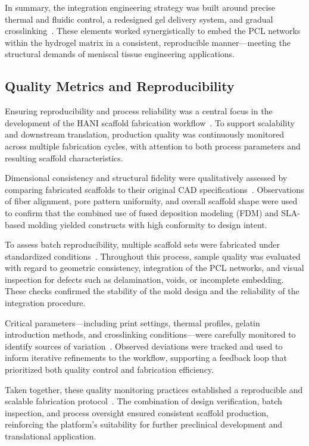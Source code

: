 In summary, the integration engineering strategy was built around precise thermal and fluidic control, a redesigned gel delivery system, and gradual crosslinking~\cite{elkommos2025hybridhydrogels}. These elements worked synergistically to embed the PCL networks within the hydrogel matrix in a consistent, reproducible manner—meeting the structural demands of meniscal tissue engineering applications.

\subsection{Quality Metrics and Reproducibility}

Ensuring reproducibility and process reliability was a central focus in the development of the HANI scaffold fabrication workflow~\cite{vedadghavami2017manufacturinghydrogel}. To support scalability and downstream translation, production quality was continuously monitored across multiple fabrication cycles, with attention to both process parameters and resulting scaffold characteristics.

Dimensional consistency and structural fidelity were qualitatively assessed by comparing fabricated scaffolds to their original CAD specifications~\cite{elkommos2025hybridhydrogels,elkommos2024developmentimproved}. Observations of fiber alignment, pore pattern uniformity, and overall scaffold shape were used to confirm that the combined use of fused deposition modeling (FDM) and SLA-based molding yielded constructs with high conformity to design intent.

To assess batch reproducibility, multiple scaffold sets were fabricated under standardized conditions~\cite{chaudhuri2016hydrogelstunable}. Throughout this process, sample quality was evaluated with regard to geometric consistency, integration of the PCL networks, and visual inspection for defects such as delamination, voids, or incomplete embedding. These checks confirmed the stability of the mold design and the reliability of the integration procedure.

Critical parameters—including print settings, thermal profiles, gelatin introduction methods, and crosslinking conditions—were carefully monitored to identify sources of variation~\cite{ahmed2015hydrogelpreparation}. Observed deviations were tracked and used to inform iterative refinements to the workflow, supporting a feedback loop that prioritized both quality control and fabrication efficiency.

Taken together, these quality monitoring practices established a reproducible and scalable fabrication protocol~\cite{elkommos2025hybridhydrogels}. The combination of design verification, batch inspection, and process oversight ensured consistent scaffold production, reinforcing the platform's suitability for further preclinical development and translational application.

